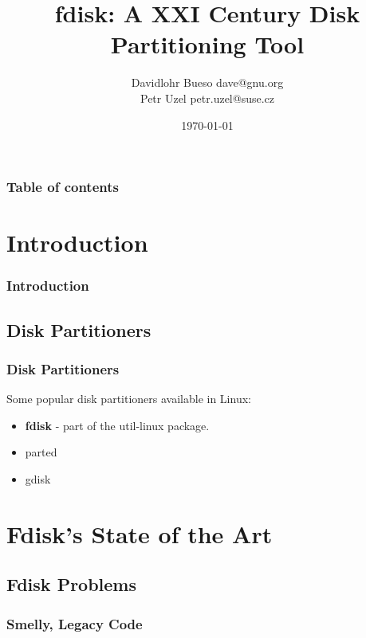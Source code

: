 \documentclass{beamer}
\begin{document}
\title{fdisk: A XXI Century Disk Partitioning Tool}
\author{Davidlohr Bueso dave@gnu.org \\ Petr Uzel petr.uzel@suse.cz}
\date{\today}

\begin{frame}
\titlepage
\end{frame}

\begin{frame}\frametitle{Table of contents}\tableofcontents
\end{frame}

\section{Introduction}
\begin{frame}\frametitle{Introduction}

\end{frame}

\subsection{Disk Partitioners}
\begin{frame}\frametitle{Disk Partitioners}
Some popular disk partitioners available in Linux:
\begin{itemize}
\item \textbf{fdisk} - part of the util-linux package.
\item parted
\item gdisk
\end{itemize}
\end{frame}


\section{Fdisk's State of the Art}
\subsection{Fdisk Problems}
\subsubsection{Smelly, Legacy Code}
\end{document}
